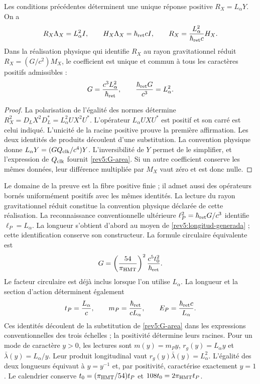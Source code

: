 \begin{theorem}
\label{rev5:rigidez-radial}
Les conditions précédentes déterminent une unique réponse positive
\(R_X=L_\alpha Y\). On a
\begin{equation}
 R_X\Lambda_X=L_\alpha^2I,\qquad
 H_X\Lambda_X=\hbar_{\rm ret}cI,\qquad
 R_X=\frac{L_\alpha^2}{\hbar_{\rm ret}c}H_X.
\end{equation}
Dans la réalisation physique qui identifie \(R_X\) au rayon
gravitationnel réduit \(R_X=(G/c^2)M_X\), le coefficient est
unique et commun à tous les caractères positifs admissibles :
\begin{equation}
 G=\frac{c^3L_\alpha^2}{\hbar_{\rm ret}},\qquad
 \frac{\hbar_{\rm ret}G}{c^3}=L_\alpha^2.
 \label{rev5:G-area}
\end{equation}
\end{theorem}
\begin{proof}
La polarisation de l'égalité des normes détermine \(R_X^2=D_LX^2D_L^*=L_\alpha^2UX^2U^*\). L'opérateur \(L_\alpha UXU^*\) est positif et son carré est celui indiqué. L'unicité de la racine positive prouve la première affirmation. Les deux identités de produits découlent d'une substitution. La convention physique donne \(L_\alpha Y=(GQ_{\rm clk}/c^4)Y\). L'inversibilité de \(Y\) permet de le simplifier, et l'expression de \(Q_{\rm clk}\) fournit \eqref{rev5:G-area}. Si un autre coefficient conserve les mêmes données, leur différence multipliée par \(M_X\) vaut zéro et est donc nulle.
\end{proof}

Le domaine de la preuve est la fibre positive finie ; il admet aussi
des opérateurs bornés uniformément positifs avec les mêmes identités.
La lecture du rayon gravitationnel réduit constitue la convention
physique déclarée de cette réalisation. La reconnaissance conventionnelle
ultérieure \(\ell_P^2=\hbar_{\rm ret}G/c^3\) identifie
\(\ell_P=L_\alpha\). La longueur s’obtient d’abord au moyen de
\eqref{rev5:longitud-generada} ; cette identification conserve son
constructeur. La formule circulaire équivalente est
\[
 G=\left(\frac{54}{\pi_{\rm HMT}}\right)^2
 \frac{c^5t_0^2}{\hbar_{\rm ret}}.
\]
Le facteur circulaire est déjà inclus lorsque l’on utilise \(L_\alpha\).
La longueur et la section d’action déterminent également
\[
 t_P=\frac{L_\alpha}{c},\qquad
 m_P=\frac{\hbar_{\rm ret}}{cL_\alpha},\qquad
 E_P=\frac{\hbar_{\rm ret}c}{L_\alpha}.
\]
Ces identités découlent de la substitution de \eqref{rev5:G-area} dans les
expressions conventionnelles des trois échelles ; la positivité
détermine leurs racines. Pour un mode de caractère \(y>0\), les
lectures sont \(m(y)=m_Py\), \(r_g(y)=L_\alpha y\) et
\(\bar\lambda(y)=L_\alpha/y\). Leur produit longitudinal
vaut \(r_g(y)\bar\lambda(y)=L_\alpha^2\). L’égalité des
deux longueurs équivaut à \(y=y^{-1}\) et, par positivité,
caractérise exactement \(y=1\). Le calendrier conserve
\(t_0=(\pi_{\rm HMT}/54)t_P\) et
\(108t_0=2\pi_{\rm HMT}t_P\).

